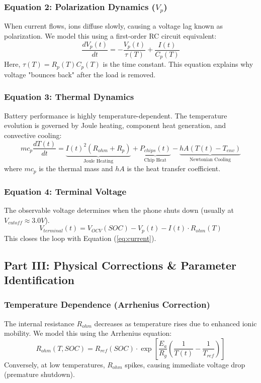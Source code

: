 \documentclass[12pt]{article}
\begin{document}
\subsubsection{Equation 2: Polarization Dynamics ($V_p$)}
When current flows, ions diffuse slowly, causing a voltage lag known as polarization. We model this using a first-order RC circuit equivalent:
\begin{equation} \label{eq:polarization}
    \frac{dV_p(t)}{dt} = -\frac{V_p(t)}{\tau(T)} + \frac{I(t)}{C_p(T)}
\end{equation}
Here, $\tau(T) = R_p(T) C_p(T)$ is the time constant. This equation explains why voltage "bounces back" after the load is removed.

\subsubsection{Equation 3: Thermal Dynamics}
Battery performance is highly temperature-dependent. The temperature evolution is governed by Joule heating, component heat generation, and convective cooling:
\begin{equation} \label{eq:thermal}
    m c_p \frac{dT(t)}{dt} = \underbrace{I(t)^2 (R_{ohm} + R_p)}_{\text{Joule Heating}} + \underbrace{P_{chips}(t)}_{\text{Chip Heat}} - \underbrace{h A (T(t) - T_{env})}_{\text{Newtonian Cooling}}
\end{equation}
where $m c_p$ is the thermal mass and $h A$ is the heat transfer coefficient.

\subsubsection{Equation 4: Terminal Voltage}
The observable voltage determines when the phone shuts down (usually at $V_{cutoff} \approx 3.0V$).
\begin{equation} \label{eq:voltage}
    V_{terminal}(t) = V_{OCV}(SOC) - V_p(t) - I(t) \cdot R_{ohm}(T)
\end{equation}
This closes the loop with Equation (\ref{eq:current}).

\subsection{Part III: Physical Corrections \& Parameter Identification}

\subsubsection{Temperature Dependence (Arrhenius Correction)}
The internal resistance $R_{ohm}$ decreases as temperature rises due to enhanced ionic mobility. We model this using the Arrhenius equation:
\begin{equation}
    R_{ohm}(T, SOC) = R_{ref}(SOC) \cdot \exp\left[ \frac{E_a}{R_g} \left( \frac{1}{T(t)} - \frac{1}{T_{ref}} \right) \right]
\end{equation}
Conversely, at low temperatures, $R_{ohm}$ spikes, causing immediate voltage drop (premature shutdown).
\end{document}
